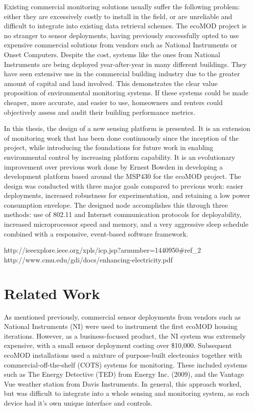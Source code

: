 Existing commercial monitoring solutions usually suffer the following problem: either they are excessively costly to install in the field, or are unreliable and difficult to integrate into existing data retrieval schemes. The ecoMOD project is no stranger to sensor deployments, having previously successfully opted to use expensive commercial solutions from vendors such as National Instruments or Onset Computers. Despite the cost, systems like the ones from National Instruments are being deployed year-after-year in many different buildings. They have seen extensive use in the commercial building industry due to the greater amount of capital and land involved. This demonstrates the clear value proposition of environmental monitoring systems. If these systems could be made cheaper, more accurate, and easier to use, homeowners and renters could objectively assess and audit their building performance metrics.

In this thesis, the design of a new sensing platform is presented. It is an extension of monitoring work that has been done continuously since the inception of the project, while introducing the foundations for future work in enabling environmental control by increasing platform capability. It is an evolutionary improvement over previous work done by Ernest Bowden in developing a development platform based around the MSP430 for the ecoMOD project\cite{Bowden2009}. The design was conducted with three major goals compared to previous work: easier deployments, increased robustness for experimentation, and retaining a low power consumption envelope. The designed node accomplishes this through three methods: use of 802.11 and Internet communication protocols for deployability, increased microprocessor speed and memory, and a very aggressive sleep schedule combined with a responsive, event-based software framework.

http://ieeexplore.ieee.org/xpls/icp.jsp?arnumber=1440950#ref_2
http://www.cmu.edu/gdi/docs/enhancing-electricity.pdf

\section{Related Work}

As mentioned previously, commercial sensor deployments from vendors such as National Instruments (NI) were used to instrument the first ecoMOD housing iterations\cite{Kidd2007}. However, as a business-focused product, the NI system was extremely expensive, with a small sensor deployment costing over \$10,000. Subsequent ecoMOD installations used a mixture of purpose-built electronics together with commercial-off-the-shelf (COTS) systems for monitoring. These included systems such as The Energy Detective (TED) from Energy Inc. (2009), and the Vantage Vue weather station from Davis Instruments. In general, this approach worked, but was difficult to integrate into a whole sensing and monitoring system, as each device had it's own unique interface and controls.

